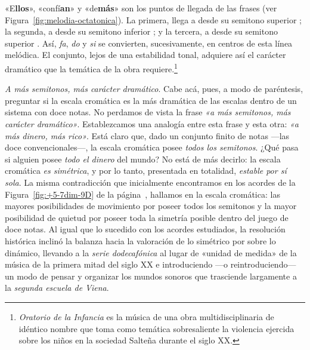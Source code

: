\documentclass[a4paper,10pt]{article}
\begin{document}
\begin{multicols}{2}
«E\textbf{llos}», «confí\textbf{an}» y «de\textbf{más}» son los puntos de llegada de las frases (ver Figura~\ref{fig:melodia-octatonica}). La primera, llega a  desde su semitono superior \hbox{;} la segunda, a  desde su semitono inferior \hbox{;} y la tercera, a  desde su semitono superior \hbox{.} Así, \emph{fa}, \emph{do} y \emph{si} se convierten, sucesivamente, en centros de esta línea melódica. El conjunto, lejos de una estabilidad tonal, adquiere así el carácter dramático que la temática de la obra requiere.\footnote{\emph{Oratorio de la Infancia} es la música de una obra multidisciplinaria de idéntico nombre que toma como temática sobresaliente la violencia ejercida sobre los niños en la sociedad Salteña durante el siglo XX.}

\emph{A más semitonos, más carácter dramático}. Cabe acá, pues, a modo de paréntesis, preguntar si la escala cromática es la más dramática de las escalas dentro de un sistema con doce notas. No perdamos de vista la frase \emph{«a más semitonos, más carácter dramático»}. Establezcamos una analogía entre esta frase y esta otra: \emph{«a más dinero, más rico»}. Está claro que, dado un conjunto finito de notas ---las doce convencionales---, la escala cromática posee \emph{todos los semitonos}. ¿Qué pasa si alguien posee \emph{todo el dinero} del mundo? No está de más decirlo: la escala cromática \emph{es simétrica}, y por lo tanto, presentada en totalidad, \emph{estable por sí sola}. La misma contradicción que inicialmente encontramos en los acordes de la Figura~\ref{fig:+5-7dim-9D} de la página~\pageref{fig:+5-7dim-9D}, hallamos en la escala cromática: las mayores posibilidades de movimiento por poseer todos los semitonos y la mayor posibilidad de quietud por poseer toda la simetría posible dentro del juego de doce notas. Al igual que lo sucedido con los acordes estudiados, la resolución histórica inclinó la balanza hacia la valoración de lo simétrico por sobre lo dinámico, llevando a la \emph{serie dodecafónica} al lugar de «unidad de medida» de la música de la primera mitad del siglo XX e introduciendo ---o reintroduciendo--- un modo de pensar y organizar los mundos sonoros que trasciende largamente a la \emph{segunda escuela de Viena}.
\end{multicols}
\end{document}
